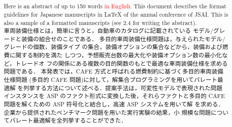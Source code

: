 \usepackage{color}

\title{
}


\author{%
\and
{}
\and
{}
}



\begin{abstract}
Here is an abstract of up to 150 words \textcolor{red}{in English}. 
This document describes the format guidelines for Japanese manuscripts in \LaTeX{} of the annual conference of JSAI. 
This is also a sample of a formatted manuscripts (see 2.4 for writing the abstract).\\
車両装備仕様とは，簡単に言うと，自動車のカタログに記載されている
モデル/グレードと装備の組合せのことである．
多目的車両装備仕様問題は，与えられたモデル/グレードの個数，装備タイプ
の集合，装備オプションの集合などから，装備および燃費に関する制約を満た
しつつ，予想販売台数の最大化や装備オプション数の最小化など，トレードオ
フの関係にある複数の目的関数のもとで最適な車両装備仕様を求める問題である．
本発表では，CAFE 方式と呼ばれる燃費制約に基づく多目的車両装備仕様問題
(多目的 CAFE 問題)に対して，解集合プログラミングを用いてパレート最適解
を列挙する方法について述べる．提案手法は，可変性モデルで表現された問題
インスタンスを ASP のファクト形式に変換した後，それらファクトと多目的
CAFE 問題を解くための ASP 符号化と結合し，高速 ASP システムを用いて解
を求める．企業から提供されたベンチマーク問題を用いた実行実験の結果，小
規模な問題についてパレート最適解を全列挙することができた．
\end{abstract}

\def\Style{``jsaiac.sty''}
\def\BibTeX{{\rm B\kern-.05em{\sc i\kern-.025em b}\kern-.08em%
 T\kern-.1667em\lower.7ex\hbox{E}\kern-.125emX}}
\def\JBibTeX{\leavevmode\lower .6ex\hbox{J}\kern-0.15em\BibTeX}
\def\LaTeXe{\LaTeX\kern.15em2$_{\textstyle\varepsilon}$}



\maketitle

